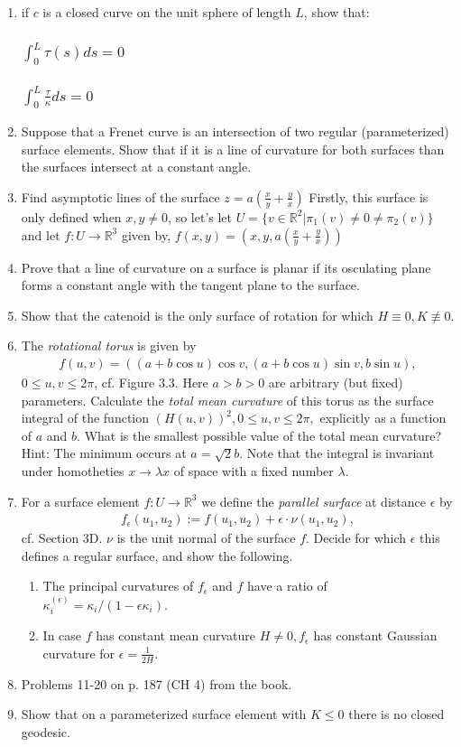\documentclass[12pt]{amsart}
\newcommand{\q}[1]{\item #1}
\newcommand{\p}[1]{\item #1}
\begin{document}
\begin{enumerate}
\newpage
\q{if $c$ is a closed curve on the unit sphere of length $L$, show that:}
\subsubsection{$\int_0^L\tau(s)ds=0$}
\subsubsection{$\int_0^L\frac{\tau}{\kappa}ds=0$}

\newpage
\q{Suppose that a Frenet curve is an intersection of two regular (parameterized) surface elements. Show that if it is a line of curvature for both surfaces than the surfaces intersect at a constant angle.}

\newpage
\q{Find asymptotic lines of the surface $z=a(\frac{x}{y}+\frac{y}{x})$}
Firstly, this surface is only defined when $x,y\neq0$, so let's let $U=\{v\in\mathbb{R}^2|\pi_1(v)\neq0\neq\pi_2(v)\}$ and let $f:U\to\mathbb{R}^3$ given by, $f(x,y)=(x,y,a(\frac{x}{y}+\frac{y}{x}))$

\newpage
\q{Prove that a line of curvature on a surface is planar if its osculating plane forms a constant angle with the tangent plane to the surface.}

\newpage
\q{Show that the catenoid is the only surface of rotation for which $H\equiv0,K\not\equiv0$.}

\newpage
\q{The \textit{rotational torus} is given by \begin{align*}f(u,v)=\left((a+b\cos u)\cos v,(a+b\cos u)\sin v,b\sin u\right),\end{align*} $0\leq u,v\leq2\pi$, cf. Figure 3.3. Here $a>b>0$ are arbitrary (but fixed) parameters. Calculate the \textit{total mean curvature} of this torus as the surface integral of the function $(H(u,v))^2,0\leq u,v\leq2\pi,$ explicitly as a function of $a$ and $b$. What is the smallest possible value of the total mean curvature?
\\Hint: The minimum occurs at $a=\sqrt2b$. Note that the integral is invariant under homotheties $x\to\lambda x$ of space with a fixed number $\lambda$.}

\newpage
\q{For a surface element $f:U\to\mathbb{R}^3$ we define the \textit{parallel surface} at distance $\epsilon$ by
\begin{align*}
	f_\epsilon(u_1,u_2):=f(u_1,u_2)+\epsilon\cdot\nu(u_1,u_2),
\end{align*}
cf. Section 3D. $\nu$ is the unit normal of the surface $f$. Decide for which $\epsilon$ this defines a regular surface, and show the following.
\begin{enumerate}
\p{The principal curvatures of $f_\epsilon$ and $f$ have a ratio of $\kappa_i^{(\epsilon)}=\kappa_i/(1-\epsilon\kappa_i).$}
\p{In case $f$ has constant mean curvature $H\neq0, f_\epsilon$ has constant Gaussian curvature for $\epsilon=\frac{1}{2H}$.}
\end{enumerate}}

\newpage
\q{Problems 11-20 on p. 187 (CH 4) from the book.}

\newpage
\q{Show that on a parameterized surface element with $K\leq0$ there is no closed geodesic.}
\end{enumerate}
\end{document}

